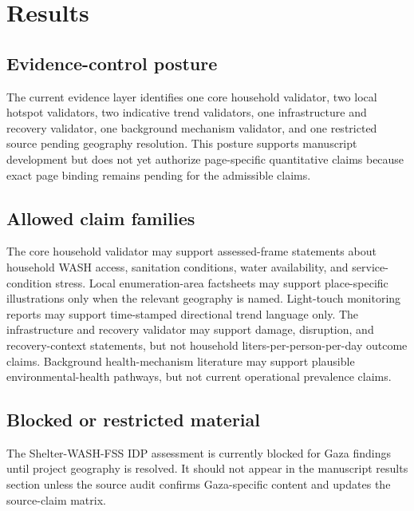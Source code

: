 
\section{Results}

\subsection{Evidence-control posture}

The current evidence layer identifies one core household validator, two local hotspot validators, two indicative trend validators, one infrastructure and recovery validator, one background mechanism validator, and one restricted source pending geography resolution. This posture supports manuscript development but does not yet authorize page-specific quantitative claims because exact page binding remains pending for the admissible claims.

\subsection{Allowed claim families}

The core household validator may support assessed-frame statements about household WASH access, sanitation conditions, water availability, and service-condition stress. Local enumeration-area factsheets may support place-specific illustrations only when the relevant geography is named. Light-touch monitoring reports may support time-stamped directional trend language only. The infrastructure and recovery validator may support damage, disruption, and recovery-context statements, but not household liters-per-person-per-day outcome claims. Background health-mechanism literature may support plausible environmental-health pathways, but not current operational prevalence claims.

\subsection{Blocked or restricted material}

The Shelter-WASH-FSS IDP assessment is currently blocked for Gaza findings until project geography is resolved. It should not appear in the manuscript results section unless the source audit confirms Gaza-specific content and updates the source-claim matrix.

